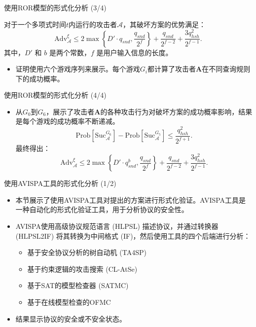 \documentclass{beamer}
\begin{document}
\begin{frame}{使用ROR模型的形式化分析 (3/4)}
    \begin{theorem}
        对于一个多项式时间$t$内运行的攻击者$\mathcal{A}$，其破坏方案的优势满足：
        \[
\text{Adv}_{\mathcal{A}}^{\xi} \leq 2 \max \left\{ D' \cdot q_{snd}, \frac{q_{snd}}{2^f} \right\} + \frac{q_{snd}}{2^{f-2}} + \frac{3q_{hsh}^2}{2^{f-1}}.
\]
        其中，$D'$ 和 $b$ 是两个常数，$f$ 是用户输入信息的长度。
    \end{theorem}
    
    \begin{itemize}
        \item 证明使用六个游戏序列来展示。每个游戏$G_i$都计算了攻击者\textbf{A}在不同查询规则下的成功概率。
    \end{itemize}
\end{frame}

\begin{frame}{使用ROR模型的形式化分析 (4/4)}
    \begin{itemize}
        \item 从$G_0$到$G_6$，展示了攻击者\textbf{A}的各种攻击行为对破坏方案的成功概率影响，结果是每个游戏的成功概率不断递减。
        \[
\text{Prob} \left[ \text{Suc}_{\mathcal{A}}^{G_6} \right] - \text{Prob} \left[ \text{Suc}_{\mathcal{A}}^{G_5} \right] \leq \frac{q_{hsh}^2}{2^{f+1}}.
\]
        最终得出：
        \[
\text{Adv}^{\xi}_{\mathcal{A}} \leq 2 \max \left\{ D' \cdot q_{snd}^{b}, \frac{q_{snd}}{2^f} \right\} + \frac{q_{snd}}{2^{f-2}} + \frac{3q_{hsh}^2}{2^{f-1}}.
\]
    \end{itemize}
\end{frame}

\begin{frame}{使用AVISPA工具的形式化分析 (1/2)}
    \begin{itemize}
        \item 本节展示了使用AVISPA工具对提出的方案进行形式化验证。AVISPA工具是一种自动化的形式化验证工具，用于分析协议的安全性。
        \item AVISPA使用高级协议规范语言 (HLPSL) 描述协议，并通过转换器 (HLPSL2IF) 将其转换为中间格式 (IF)，然后使用工具的四个后端进行分析：
        \begin{itemize}
            \item 基于安全协议分析的树自动机 (TA4SP)
            \item 基于约束逻辑的攻击搜索 (CL-AtSe)
            \item 基于SAT的模型检查器 (SATMC)
            \item 基于在线模型检查的OFMC
        \end{itemize}
        \item 结果显示协议的安全或不安全状态。
    \end{itemize}
\end{frame}
\end{document}
